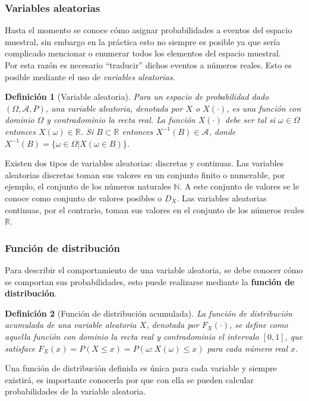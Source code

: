 \documentclass[12pt]{article}
\newtheorem{definition}{Definición}
\begin{document}
\subsubsection{Variables aleatorias}
Hasta el momento se conoce cómo asignar probabilidades a eventos del espacio muestral, sin embargo en la práctica esto no siempre es posible ya que sería complicado mencionar o enumerar todos los elementos del espacio muestral.\\

Por esta razón es necesario ``traducir'' dichos eventos a números reales. Esto es posible mediante el uso de \textit{variables aleatorias}.
\begin{definition}[Variable aleatoria]
    Para un espacio de probabilidad dado $(\Omega, \mathscr A, P)$, una variable aleatoria, denotada por $X$ o $X(\cdot)$, es una función con dominio $\Omega$ y contradominio la recta real. La función $X(\cdot)$ debe ser tal si $\omega\in\Omega$ entonces $X(\omega)\in\mathbb R$. Si $B\subset \mathbb R$ entonces $X^{-1}(B)\in\mathscr A$, donde $X^{-1}(B)=\{\omega\in\Omega| X(\omega\in B)\}$.
\end{definition}
Existen dos tipos de variables aleatorias: discretas y continuas. Las variables aleatorias discretas toman sus valores en un conjunto finito o numerable, por ejemplo, el conjunto de los números naturales $\mathbb N$. A este conjunto de valores se le conoce como conjunto de valores posibles o $D_X$. Las variables aleatorias continuas, por el contrario, toman sus valores en el conjunto de los números reales $\mathbb R$.

\subsubsection{Función de distribución}
Para describir el comportamiento de una variable aleatoria, se debe conocer cómo se comportan sus probabilidades, esto puede realizarse mediante la \textbf{función de distribución}.

\begin{definition}[Función de distribución acumulada]
    La función de distribución acumulada de una variable aleatoria $X$, denotada por $F_X(\cdot)$, se define como aquella función con dominio la recta real y contradominio el intervalo $[0,1]$, que satisface $F_X(x)=P(X\leq x)=P({\omega: X(\omega)\leq x})$ para cada número real $x$.
\end{definition}
Una función de distribución definida es única para cada variable y siempre existirá, es importante conocerla por que con ella se pueden calcular probabilidades de la variable aleatoria.\\
\end{document}
